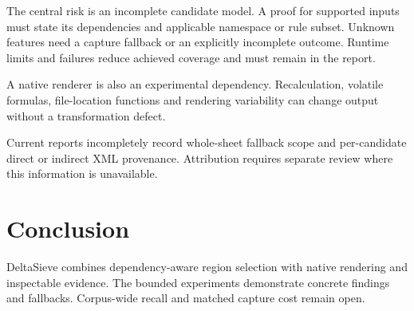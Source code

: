The central risk is an incomplete candidate model. A proof for supported inputs
must state its dependencies and applicable namespace or rule subset. Unknown
features need a capture fallback or an explicitly incomplete outcome. Runtime
limits and failures reduce achieved coverage and must remain in the report.

A native renderer is also an experimental dependency. Recalculation, volatile
formulas, file-location functions and rendering variability can change output
without a transformation defect.

Current reports incompletely record whole-sheet fallback scope and
per-candidate direct or indirect XML provenance. Attribution requires separate
review where this information is unavailable.

\section{Conclusion}
DeltaSieve combines dependency-aware region selection with native rendering
and inspectable evidence. The bounded experiments demonstrate concrete
findings and fallbacks. Corpus-wide recall and matched capture cost remain
open.
